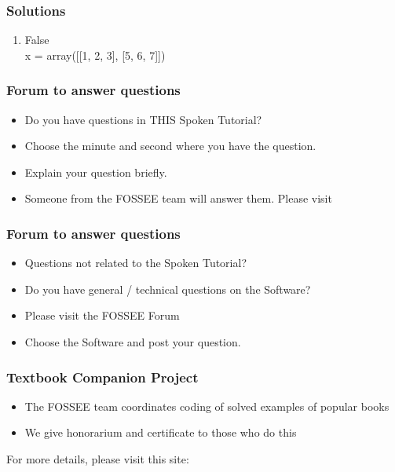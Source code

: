 \documentclass[17pt]{beamer}
\begin{document}
\begin{frame}
\frametitle{Solutions}

\begin{enumerate}
\item False\\
     x = array([[1, 2, 3], [5, 6, 7]])
\end{enumerate}
\end{frame}
\begin{frame}
\frametitle{Forum to answer questions}
\begin{itemize}
\item Do you have questions in THIS Spoken Tutorial?
\item Choose the minute and second where you have the question.
\item Explain your question briefly.
\item Someone from the FOSSEE team will answer them. Please visit 
\end{itemize}
\begin{center}
{\color{blue}{http://forums.spoken-tutorial.org/}}
 \end{center} 
\end{frame}
\begin{frame}
\frametitle{Forum to answer questions}
\begin{itemize}
\item Questions not related to the Spoken Tutorial?
\item Do you have general / technical questions on the Software?
\item Please visit the FOSSEE Forum
\begin{center}
{\color{blue}{http://forums.fossee.in/}}
 \end{center}
\item Choose the Software and post your question.
\end{itemize}
\end{frame}
\begin{frame}
\frametitle{Textbook Companion Project}
\begin{itemize}
\item The FOSSEE team coordinates coding of solved examples of popular
  books 
\item We give honorarium and certificate to those who do this
\end{itemize}
For more details, please visit this site:
\begin{center}
{\color{blue}{http://tbc-python.fossee.in/}}
\end{center}
\end{frame}
\end{document}
